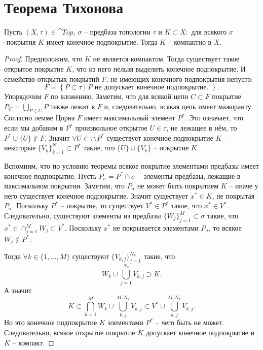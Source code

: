 \section{Теорема Тихонова}
\begin{lemma}[Александер]
    Пусть $(X, \tau) \in \cat{Top}$, $\sigma$ -- предбаза топологии $\tau$ и $K \subset X\colon$ для всякого $\sigma$-покрытия $K$ имеет конечное подпокрытие.
    Тогда $K$ -- компактно в $X$.
\end{lemma}
\begin{proof}
    Предположим, что $K$ не является компактом.
    Тогда существует такое открытое покрытие $K$, что из него нельзя выделить конечное подпокрытие.
    И семейство открытых покрытий $F$, не имеющих конечного подпокрытия непусто:
    \[
        F = \left\{P \subset \tau \mid P\text{ не допускает конечное подпокрытие. }\right\}.
    \]
    Упорядочим $F$ по вложению.
    Заметим, что для всякой цепи $C \subset F$ покрытие $P_C = \bigcup_{P \in C} P$ также лежит в $F$ и, следовательно, всякая цепь имеет мажоранту.
    Согласно лемме Цорна $F$ имеет максимальный элемент $P^*$.
    Это означает, что если мы добавим в $P^*$ произвольное открытое $U \in \tau$, не лежащее в нём, то $P^* \cup \{U\} \notin F$.
    Значит $\forall U \in \tau \setminus P^*$ существует конечное подпокрытие $K$ -- некоторые $\{V_k\}_{k = 1}^{N} \subset P^*$ такие, что
    $\{U\} \cup \{V_k\}$ -- покрытие $K$.

    Вспомним, что по условию теоремы всякое покрытие элементами предбазы имеет конечное подпокрытие.
    Пусть $P_\sigma = P^* \cap \sigma$ -- элементы предбазы, лежащие в максимальном покрытии.
    Заметим, что $P_\sigma$ не может быть покрытием $K$ -- иначе у него существует конечное подпокрытие.
    Значит существует $x^* \in K$, не покрытая $P_\sigma$.
    Поскольку $P^*$ -- покрытие, то существует $V^* \in P^*$ такое, что $x^* \in V^*$.
    Следовательно, существуют элементы из предбазы $\{W_j\}_{j = 1}^{M} \subset \sigma$ такие, что $x^* \in \cap_{j = 1}^{M} W_j \subset V^*$.
    Поскольку $x^*$ не покрывается элементами $P_{\sigma}$, то всякое $W_j \notin P^*$.

    Тогда $\forall k \in \{1, \ldots, M\}$ существуют $\{V_{k, j}\}_{j = 1}^{N_k}$ такие, что
    \[
        W_k \cup \bigcup_{j = 1}^{N_k} V_{k, j} \supset K.
    \]
    А значит
    \[
        K \subset \bigcap_{k = 1}^{M} W_k \cup \bigcup_{k, j}^{M, N_k} V_{k, j} \subset V^* \cup \bigcup_{k, j}^{M, N_k} V_{k, j}.
    \]
    Но это конечное подпокрытие $K$ элементами $P^*$ -- чего быть не может.
    Следовательно, всякое открытое покрытие $K$ допускает конечное подпокрытие и $K$ -- компакт. %
\end{proof}
